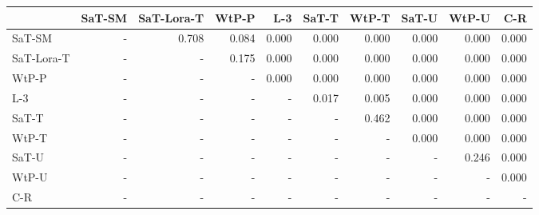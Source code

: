 \begin{tabular}{lrrrrrrrrr}
\toprule
 & SaT-SM & SaT-Lora-T & WtP-P & L-3 & SaT-T & WtP-T & SaT-U & WtP-U & C-R \\
\midrule
SaT-SM & - & 0.708 & 0.084 & 0.000 & 0.000 & 0.000 & 0.000 & 0.000 & 0.000 \\
SaT-Lora-T & - & - & 0.175 & 0.000 & 0.000 & 0.000 & 0.000 & 0.000 & 0.000 \\
WtP-P & - & - & - & 0.000 & 0.000 & 0.000 & 0.000 & 0.000 & 0.000 \\
L-3 & - & - & - & - & 0.017 & 0.005 & 0.000 & 0.000 & 0.000 \\
SaT-T & - & - & - & - & - & 0.462 & 0.000 & 0.000 & 0.000 \\
WtP-T & - & - & - & - & - & - & 0.000 & 0.000 & 0.000 \\
SaT-U & - & - & - & - & - & - & - & 0.246 & 0.000 \\
WtP-U & - & - & - & - & - & - & - & - & 0.000 \\
C-R & - & - & - & - & - & - & - & - & - \\
\bottomrule
\end{tabular}

